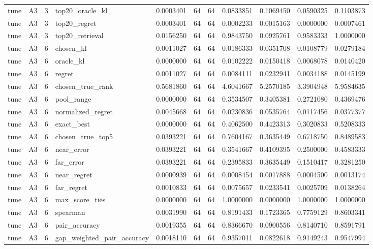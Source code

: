 \begin{tabular}{llrlrrrrrrr}
tune & A3 & 3 & top20_oracle_kl & 0.0003401 & 64 & 64 & 0.0833851 & 0.1069450 & 0.0590325 & 0.1103873 \\
tune & A3 & 3 & top20_regret & 0.0003401 & 64 & 64 & 0.0002233 & 0.0015163 & 0.0000000 & 0.0007461 \\
tune & A3 & 3 & top20_retrieval & 0.0156250 & 64 & 64 & 0.9843750 & 0.0925761 & 0.9583333 & 1.0000000 \\
tune & A3 & 6 & chosen_kl & 0.0011027 & 64 & 64 & 0.0186333 & 0.0351708 & 0.0108779 & 0.0279184 \\
tune & A3 & 6 & oracle_kl & 0.0000000 & 64 & 64 & 0.0102222 & 0.0150418 & 0.0068078 & 0.0140420 \\
tune & A3 & 6 & regret & 0.0011027 & 64 & 64 & 0.0084111 & 0.0232941 & 0.0034188 & 0.0145199 \\
tune & A3 & 6 & chosen_true_rank & 0.5681860 & 64 & 64 & 4.6041667 & 5.2570185 & 3.3904948 & 5.9584635 \\
tune & A3 & 6 & pool_range & 0.0000000 & 64 & 64 & 0.3534507 & 0.3405381 & 0.2721080 & 0.4369476 \\
tune & A3 & 6 & normalized_regret & 0.0045668 & 64 & 64 & 0.0230836 & 0.0535764 & 0.0117456 & 0.0377377 \\
tune & A3 & 6 & exact_best & 0.0000000 & 64 & 64 & 0.4062500 & 0.4423313 & 0.3020833 & 0.5208333 \\
tune & A3 & 6 & chosen_true_top5 & 0.0393221 & 64 & 64 & 0.7604167 & 0.3635449 & 0.6718750 & 0.8489583 \\
tune & A3 & 6 & near_error & 0.0393221 & 64 & 64 & 0.3541667 & 0.4109395 & 0.2500000 & 0.4583333 \\
tune & A3 & 6 & far_error & 0.0393221 & 64 & 64 & 0.2395833 & 0.3635449 & 0.1510417 & 0.3281250 \\
tune & A3 & 6 & near_regret & 0.0000939 & 64 & 64 & 0.0008454 & 0.0017888 & 0.0004500 & 0.0013174 \\
tune & A3 & 6 & far_regret & 0.0010833 & 64 & 64 & 0.0075657 & 0.0233541 & 0.0025709 & 0.0138264 \\
tune & A3 & 6 & max_score_ties & 0.0000000 & 64 & 64 & 1.0000000 & 0.0000000 & 1.0000000 & 1.0000000 \\
tune & A3 & 6 & spearman & 0.0031990 & 64 & 64 & 0.8191433 & 0.1723365 & 0.7759129 & 0.8603341 \\
tune & A3 & 6 & pair_accuracy & 0.0019355 & 64 & 64 & 0.8366670 & 0.0900556 & 0.8140710 & 0.8591791 \\
tune & A3 & 6 & gap_weighted_pair_accuracy & 0.0018110 & 64 & 64 & 0.9357011 & 0.0822618 & 0.9149243 & 0.9547994 \\

\end{tabular}
